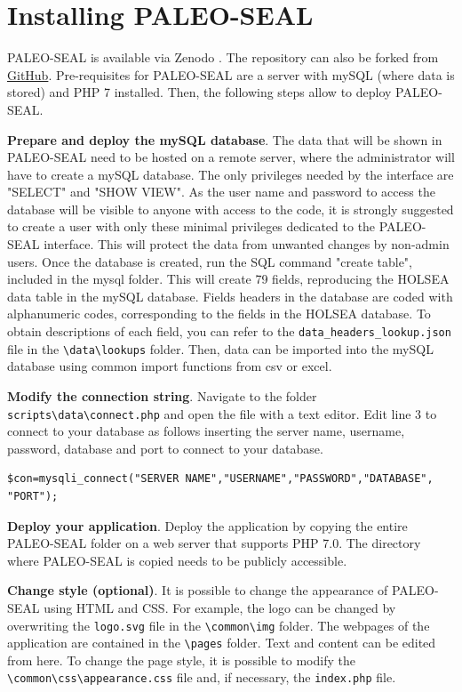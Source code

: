 \documentclass[a4paper,fleqn]{cas-dc}
\begin{document}
\section{Installing PALEO-SEAL}
PALEO-SEAL is available via Zenodo \citep{paleoseal2020}. The repository can also be forked from \href{https://github.com/jDrechsel/PALEO-SEAL.git}{GitHub}. Pre-requisites for PALEO-SEAL are a server with mySQL (where data is stored) and PHP 7 installed. Then, the following steps allow to deploy PALEO-SEAL.

\textbf{Prepare and deploy the mySQL database}. The data that will be shown in PALEO-SEAL need to be hosted on a remote server, where the administrator will have to create a mySQL database. The only privileges needed by the interface are "SELECT" and "SHOW VIEW". As the user name and password to access the database will be visible to anyone with access to the code, it is strongly suggested to create a user with only these minimal privileges dedicated to the PALEO-SEAL interface. This will protect the data from unwanted changes by non-admin users. Once the database is created, run the SQL command "create table", included in the mysql folder. This will create 79 fields, reproducing the HOLSEA data table in the mySQL database. Fields headers in the database are coded with alphanumeric codes, corresponding to the fields in the HOLSEA database. To obtain descriptions of each field, you can refer to the \texttt{data\_headers\_lookup.json} file in the \texttt{\textbackslash data\textbackslash lookups} folder. Then, data can be imported into the mySQL database using common import functions from csv or excel.

\textbf{Modify the connection string}. Navigate to the folder \texttt{scripts\textbackslash data\textbackslash connect.php} and open the file with a text editor. Edit line 3 to connect to your database as follows inserting the server name, username, password, database and port to connect to your database.

\begin{lstlisting}
$con=mysqli_connect("SERVER NAME","USERNAME","PASSWORD","DATABASE", "PORT");
\end{lstlisting}


\textbf{Deploy your application}. Deploy the application by copying the entire PALEO-SEAL folder on a web server that supports PHP 7.0. The directory where PALEO-SEAL is copied needs to be publicly accessible.

\textbf{Change style (optional)}. It is possible to change the appearance of PALEO-SEAL using HTML and CSS. For example, the logo can be changed by overwriting the \texttt{logo.svg} file in the \texttt{\textbackslash common\textbackslash img} folder. The webpages of the application are contained in the \texttt{\textbackslash pages} folder. Text and content can be edited from here. To change the page style, it is possible to modify the \texttt{\textbackslash common\textbackslash css\textbackslash appearance.css} file and, if necessary, the \texttt{index.php} file.
\end{document}
